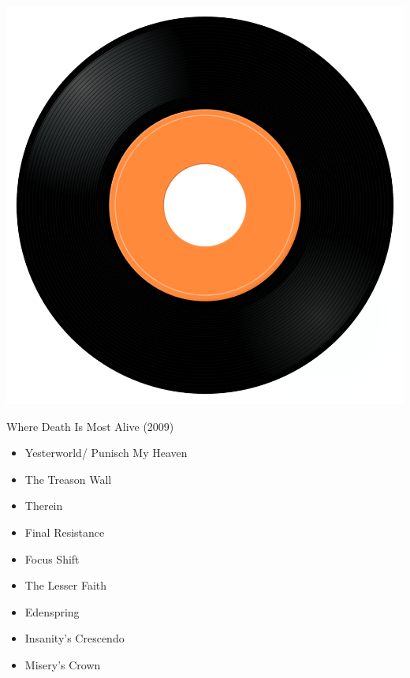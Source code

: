 \begin{minipage}[t]{0.25\textwidth}\vspace{0pt}
\captionsetup{type=figure}
\includegraphics[width=\textwidth]{Images/cover.png}
\caption*{Where Death Is Most Alive (2009)}
\end{minipage}
\begin{minipage}[t]{0.25\textwidth}\vspace{0pt}
\begin{itemize}[nosep,leftmargin=1em,labelwidth=*,align=left]
	\setlength{\itemsep}{0pt}
	\item Yesterworld/ Punisch My Heaven
	\item The Treason Wall
	\item Therein
	\item Final Resistance
	\item Focus Shift
	\item The Lesser Faith
	\item Edenspring
	\item Insanity's Crescendo
	\item Misery's Crown
\end{itemize}
\end{minipage}
